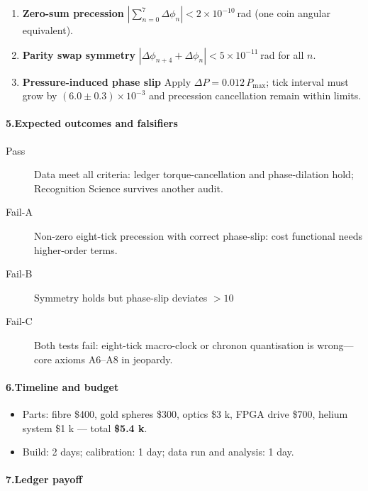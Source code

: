 \documentclass[11pt,oneside]{book}
\begin{document}
\begin{enumerate}
\item \textbf{Zero-sum precession}  
      $|\sum_{n=0}^{7}\Delta\phi_n|<2\times10^{-10}$ rad (one coin angular equivalent).
\item \textbf{Parity swap symmetry}  
      $|\Delta\phi_{n+4}+\Delta\phi_n|<5\times10^{-11}$ rad for all $n$.
\item \textbf{Pressure-induced phase slip}  
      Apply $\Delta P=0.012\,P_{\max}$; tick interval must grow by $(6.0\pm0.3)\times10^{-3}$ and precession cancellation remain within limits.
\end{enumerate}

\paragraph*{5.\;Expected outcomes and falsifiers}

\begin{description}
\item[Pass]  Data meet all criteria: ledger torque-cancellation and phase-dilation hold; Recognition Science survives another audit.
\item[Fail-A]  Non-zero eight-tick precession with correct phase-slip: cost functional needs higher-order terms.  
\item[Fail-B]  Symmetry holds but phase-slip deviates $>10$ %
\item[Fail-C]  Both tests fail: eight-tick macro-clock or chronon quantisation is wrong—core axioms A6–A8 in jeopardy.
\end{description}

\paragraph*{6.\;Timeline and budget}

\begin{itemize}
\item Parts: fibre \$400, gold spheres \$300, optics \$3 k, FPGA drive \$700, helium system \$1 k — total \textbf{\$5.4 k}.
\item Build: 2 days; calibration: 1 day; data run and analysis: 1 day.
\end{itemize}

\paragraph*{7.\;Ledger payoff}
\end{document}
